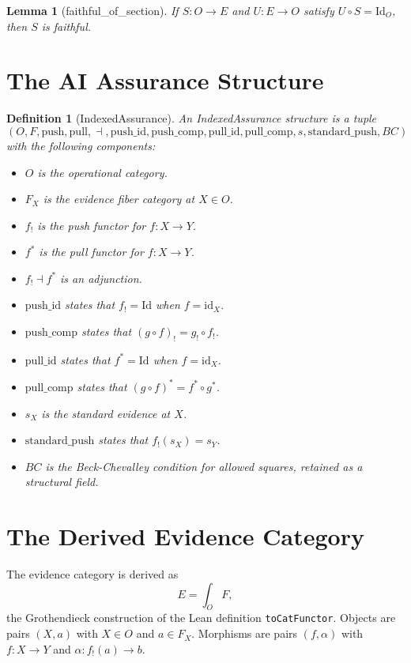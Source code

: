 \documentclass{article}
\newtheorem{lemma}[theorem]{Lemma}
\newtheorem{definition}[theorem]{Definition}
\begin{document}
\begin{lemma}[faithful\_of\_section]
If $S : O \to E$ and $U : E \to O$ satisfy $U \circ S = \mathrm{Id}_O$, then $S$ is faithful.
\end{lemma}

\section{The AI Assurance Structure}

\begin{definition}[IndexedAssurance]
An \emph{IndexedAssurance} structure is a tuple
\[
  (O,F,\mathrm{push},\mathrm{pull},\dashv,
   \mathrm{push\_id},\mathrm{push\_comp},
   \mathrm{pull\_id},\mathrm{pull\_comp},
   s,\mathrm{standard\_push},BC)
\]
with the following components:
\begin{itemize}
\item $O$ is the operational category.
\item $F_X$ is the evidence fiber category at $X \in O$.
\item $f_!$ is the push functor for $f : X \to Y$.
\item $f^*$ is the pull functor for $f : X \to Y$.
\item $f_! \dashv f^*$ is an adjunction.
\item $\mathrm{push\_id}$ states that $f_! = \mathrm{Id}$ when $f = \mathrm{id}_X$.
\item $\mathrm{push\_comp}$ states that $(g \circ f)_! = g_! \circ f_!$.
\item $\mathrm{pull\_id}$ states that $f^* = \mathrm{Id}$ when $f = \mathrm{id}_X$.
\item $\mathrm{pull\_comp}$ states that $(g \circ f)^* = f^* \circ g^*$.
\item $s_X$ is the standard evidence at $X$.
\item $\mathrm{standard\_push}$ states that $f_!(s_X)=s_Y$.
\item $BC$ is the Beck-Chevalley condition for allowed squares, retained as a structural field.
\end{itemize}
\end{definition}

\section{The Derived Evidence Category}

The evidence category is derived as
\[
  E = \int_O F,
\]
the Grothendieck construction of the Lean definition \texttt{toCatFunctor}. Objects are pairs $(X,a)$ with $X \in O$ and $a \in F_X$. Morphisms are pairs $(f,\alpha)$ with $f : X \to Y$ and $\alpha : f_!(a) \to b$.
\end{document}
